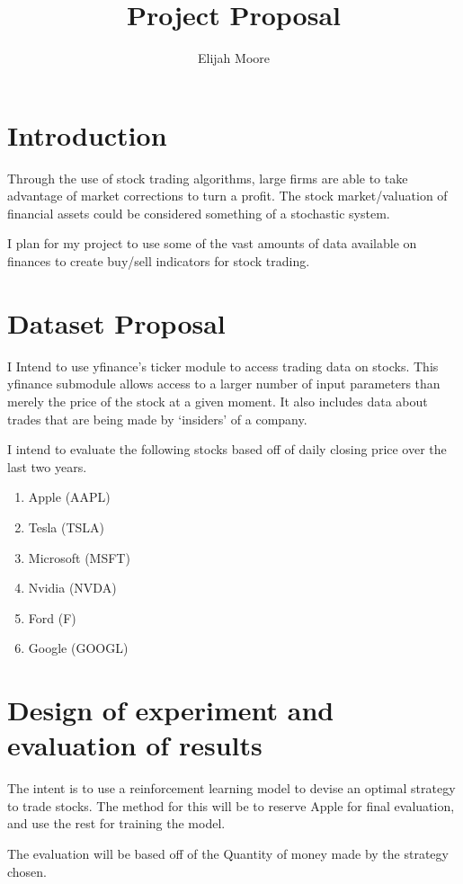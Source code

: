 \documentclass{article}
\title{Project Proposal}
\author{Elijah Moore}
\begin{document}
\maketitle
\section{Introduction}

   Through the use of stock trading algorithms, large firms are able to take advantage of market corrections
   to turn a profit. The stock market/valuation of financial assets could be considered something of a stochastic system.
   
   I plan for my project to use some of the vast amounts of data available on finances to
   create buy/sell indicators for stock trading.

\section{Dataset Proposal}
    I Intend to use yfinance's ticker module to access trading data on stocks.
    This yfinance submodule allows access to a larger number of input parameters than merely the price of the stock at a given moment.
    It also includes data about trades that are being made by `insiders' of a company.

    I intend to evaluate the following stocks based off of daily closing price over the last two years.
    \begin{enumerate}
        \item Apple (AAPL)
        \item Tesla (TSLA)
        \item Microsoft (MSFT)
        \item Nvidia (NVDA)
        \item Ford (F)
        \item Google (GOOGL)
    \end{enumerate}
\section{Design of experiment and evaluation of results}

    The intent is to use a reinforcement learning model to devise an optimal strategy to trade stocks.
    The method for this will be to reserve Apple for final evaluation, and use the rest for training the model.
    
    The evaluation will be based off of the Quantity of money made by the strategy chosen.


    

    
\end{document}
